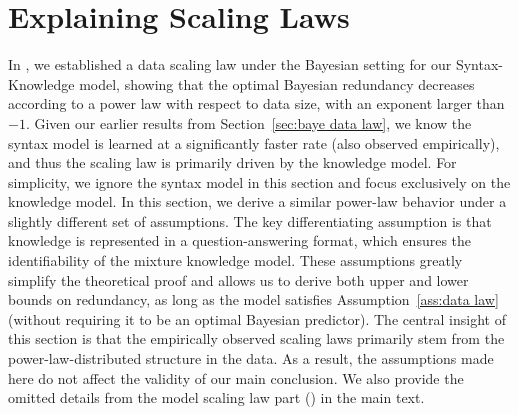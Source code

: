 \documentclass[11pt]{article}
\theoremstyle{plain}
\theoremstyle{definition}
\begin{document}
\section{Explaining Scaling Laws}
\label{sec: scaling law}
In , we established a data scaling law under the Bayesian setting for our Syntax-Knowledge model, showing that the optimal Bayesian redundancy decreases according to a power law with respect to data size, with an exponent larger than \(-1\).  Given our earlier results from Section~\ref{sec:baye data law}, we know the syntax model is learned at a significantly faster rate (also observed empirically), and thus the  scaling law is primarily driven by the knowledge model. For simplicity, we ignore the syntax model in this section and focus exclusively on the knowledge model. In this section, we derive a similar power-law behavior under a slightly different set of assumptions. The key differentiating assumption is that knowledge is represented in a question-answering format, which ensures the identifiability of the mixture knowledge model. These assumptions greatly simplify the theoretical proof and allows us to derive both upper and lower bounds on redundancy, as long as the model satisfies Assumption~\ref{ass:data law} (without requiring it to be an optimal Bayesian predictor). The central insight of this section is that the empirically observed scaling laws primarily stem from the power-law-distributed structure in the data. As a result, the assumptions made here do not affect the validity of our main conclusion.
We also provide the omitted details from the model scaling law part () in the main text.
\end{document}
